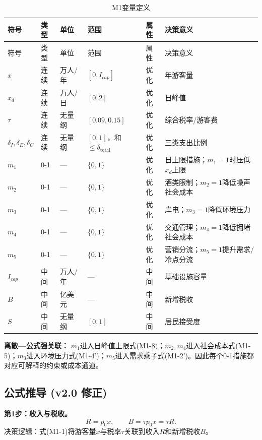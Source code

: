 \documentclass[UTF8,a4paper,12pt]{ctexart}
\begin{document}
\begin{longtable}{@{}p{1.5cm}p{1.3cm}p{1.1cm}p{2.0cm}p{1.2cm}p{5.3cm}@{}}
\caption{M1变量定义}\\
\toprule
符号 & 类型 & 单位 & 范围 & 属性 & 决策意义\\
\midrule
\endfirsthead
\toprule
符号 & 类型 & 单位 & 范围 & 属性 & 决策意义\\
\midrule
\endhead
\(x\) & 连续 & 万人/年 & \([0,I_{cap}]\) & 优化 & 年游客量\\
\(x_d\) & 连续 & 万人/日 & \([0,2]\) & 优化 & 日峰值\\
\(\tau\) & 连续 & 无量纲 & \([0.09,0.15]\) & 优化 & 综合税率/游客费\\
\(\delta_I,\delta_E,\delta_C\) & 连续 & 无量纲 & \([0,1]\)，和\(\le\delta_{\mathrm{total}}\) & 优化 & 三类支出比例\\
\(m_1\) & 0-1 & — & \(\{0,1\}\) & 优化 & 日上限措施；\(m_1=1\)时压低\(x_d\)上限\\
\(m_2\) & 0-1 & — & \(\{0,1\}\) & 优化 & 酒类限制；\(m_2=1\)降低噪声社会成本\\
\(m_3\) & 0-1 & — & \(\{0,1\}\) & 优化 & 岸电；\(m_3=1\)降低环境压力\\
\(m_4\) & 0-1 & — & \(\{0,1\}\) & 优化 & 交通管理；\(m_4=1\)降低拥堵社会成本\\
\(m_5\) & 0-1 & — & \(\{0,1\}\) & 优化 & 营销分流；\(m_5=1\)提升需求/冷点分流\\
\(I_{cap}\) & 中间 & 万人/年 & — & 中间 & 基础设施容量\\
\(B\) & 中间 & 亿美元 & — & 中间 & 新增税收\\
\(S\) & 中间 & 无量纲 & \([0,1]\) & 中间 & 居民接受度\\
\bottomrule
\end{longtable}

\textbf{离散—公式强关联：} \(m_1\)进入日峰值上限式(M1-8)；\(m_2,m_4\)进入社会成本式(M1-5)；\(m_3\)进入环境压力式(M1-4')；\(m_5\)进入需求乘子式(M1-2')。因此每个0-1措施都对应可解释的约束或成本通道。

\subsection{公式推导 (v2.0 修正)}

\textbf{第1步：收入与税收。} 
\begin{equation}\tag{M1-1}
R=p_0x,\qquad B=\tau p_0x=\tau R.
\end{equation}
决策逻辑：式(M1-1)将游客量\(x\)与税率\(\tau\)关联到收入\(R\)和新增税收\(B\)。
\end{document}
